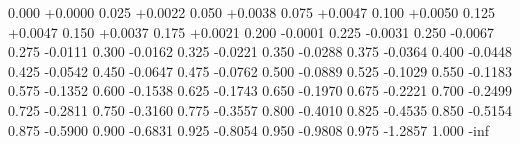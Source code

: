 0.000 +0.0000
0.025 +0.0022
0.050 +0.0038
0.075 +0.0047
0.100 +0.0050
0.125 +0.0047
0.150 +0.0037
0.175 +0.0021
0.200 -0.0001
0.225 -0.0031
0.250 -0.0067
0.275 -0.0111
0.300 -0.0162
0.325 -0.0221
0.350 -0.0288
0.375 -0.0364
0.400 -0.0448
0.425 -0.0542
0.450 -0.0647
0.475 -0.0762
0.500 -0.0889
0.525 -0.1029
0.550 -0.1183
0.575 -0.1352
0.600 -0.1538
0.625 -0.1743
0.650 -0.1970
0.675 -0.2221
0.700 -0.2499
0.725 -0.2811
0.750 -0.3160
0.775 -0.3557
0.800 -0.4010
0.825 -0.4535
0.850 -0.5154
0.875 -0.5900
0.900 -0.6831
0.925 -0.8054
0.950 -0.9808
0.975 -1.2857
1.000 -inf
